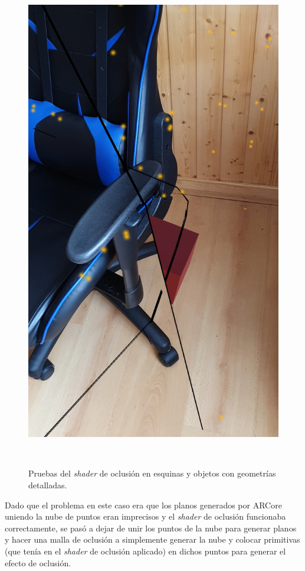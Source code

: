 \begin{figure}[H]
\begin{minipage}{0.5\textwidth}
    \end{minipage}
    \begin{minipage}{0.5\textwidth}
        \centering
        \includegraphics[scale=0.15]{Images/Shaders/oclusionprueba2 (2).jpg}\\
    \end{minipage}\\
    \caption{Pruebas del \textit{shader} de oclusión en esquinas y objetos con geometrías detalladas.}
    \label{fig:shaderprofprueba2}
\end{figure}

Dado que el problema en este caso era que los planos generados por ARCore uniendo la nube de puntos eran imprecisos y el \textit{shader} de oclusión funcionaba correctamente, se pasó a dejar de unir los puntos de la nube para generar planos y hacer una malla de oclusión a simplemente generar la nube y colocar primitivas (que tenía en el \textit{shader} de oclusión aplicado) en dichos puntos para generar el efecto de oclusión. 